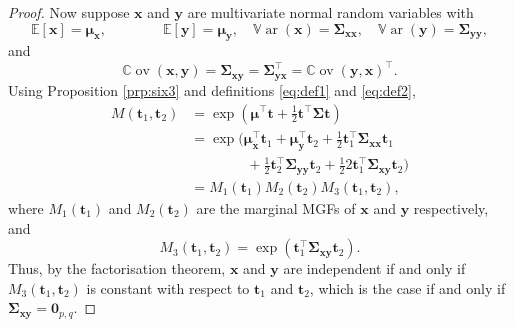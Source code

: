 \documentclass[]{book}
\theoremstyle{definition}
\theoremstyle{definition}
\theoremstyle{definition}
\theoremstyle{remark}
\begin{document}
\begin{proof}
Now suppose \(\boldsymbol x\) and \(\boldsymbol y\) are multivariate normal random variables with
\begin{equation}
{\mathbb{E}}[\boldsymbol x]=\boldsymbol \mu_{\boldsymbol x}, \qquad \qquad {\mathbb{E}}[\boldsymbol y]=\boldsymbol \mu_{\boldsymbol y}, \quad  {\mathbb{V}\operatorname{ar}}(\boldsymbol x)=\boldsymbol \Sigma_{\boldsymbol x\boldsymbol x},
\quad  {\mathbb{V}\operatorname{ar}}(\boldsymbol y)=\boldsymbol \Sigma_{\boldsymbol y\boldsymbol y},
\label{eq:def1}
\end{equation}
and
\begin{equation}
{\mathbb{C}\operatorname{ov}}(\boldsymbol x,\boldsymbol y)=\boldsymbol \Sigma_{\boldsymbol x\boldsymbol y}=\boldsymbol \Sigma_{\boldsymbol y\boldsymbol x}^\top = {\mathbb{C}\operatorname{ov}}(\boldsymbol y, \boldsymbol x)^\top.
\label{eq:def2}
\end{equation}
Using Proposition \ref{prp:six3} and definitions \eqref{eq:def1} and \eqref{eq:def2},
\begin{align*}
M({\boldsymbol t}_1, {\boldsymbol t}_2)&=\exp\left ( \boldsymbol \mu^\top {\boldsymbol t}+ \frac{1}{2}{\boldsymbol t}^\top \boldsymbol \Sigma{\boldsymbol t}\right )\\
&=\exp\bigg (\boldsymbol \mu_{\boldsymbol x}^\top {\boldsymbol t}_1 +\boldsymbol \mu_{\boldsymbol y}^\top {\boldsymbol t}_2+\frac{1}{2}{\boldsymbol t}_1^\top \boldsymbol \Sigma_{\boldsymbol x\boldsymbol x}{{\boldsymbol t}_1}\\
& \qquad \qquad +\frac{1}{2}{\boldsymbol t}_2^\top  \boldsymbol \Sigma_{\boldsymbol y\boldsymbol y}{\boldsymbol t}_2+\frac{1}{2} 2{\boldsymbol t}_1^\top \boldsymbol \Sigma_{\boldsymbol x\boldsymbol y}{\boldsymbol t}_2 \bigg)\\
&=M_1({\boldsymbol t}_1)M_2({\boldsymbol t}_2)M_3({\boldsymbol t}_1, {\boldsymbol t}_2),
\end{align*}
where \(M_1({\boldsymbol t}_1)\) and \(M_2({\boldsymbol t}_2)\) are the marginal MGFs of \(\boldsymbol x\) and \(\boldsymbol y\) respectively, and
\[
M_3({\boldsymbol t}_1, {\boldsymbol t}_2)=\exp\left ({\boldsymbol t}_1^\top \boldsymbol \Sigma_{\boldsymbol x\boldsymbol y}{\boldsymbol t}_2 \right ).
\]
Thus, by the factorisation theorem, \(\boldsymbol x\) and \(\boldsymbol y\) are independent if and only if \(M_3({\boldsymbol t}_1, {\boldsymbol t}_2)\) is constant with respect to
\({\boldsymbol t}_1\) and \({\boldsymbol t}_2\), which is the case if and only if \(\boldsymbol \Sigma_{\boldsymbol x\boldsymbol y}={\mathbf 0}_{p,q}\).
\end{proof}
\end{document}
